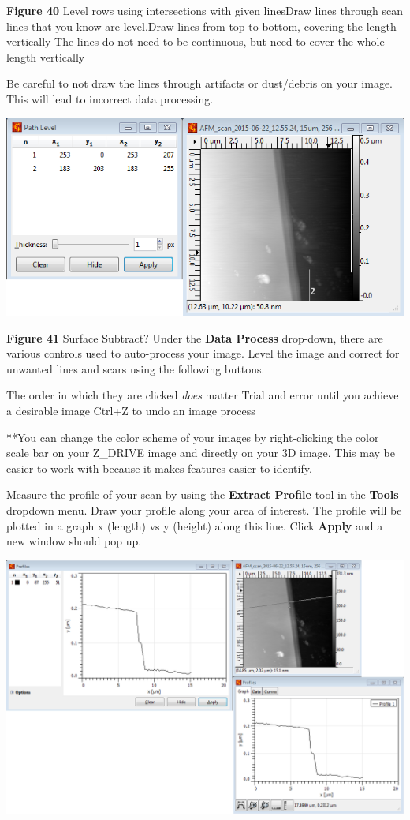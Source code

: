 \documentclass{../lab}
\begin{document}
\textbf{Figure 40}
 Level rows using intersections with given linesDraw lines through scan lines that you know are level.Draw lines from top to bottom, covering the length vertically
The lines do not need to be continuous, but need to cover the whole length vertically

Be careful to not draw the lines through artifacts or dust/debris on your image. This will lead to incorrect data processing.


\begin{center}
    \href{http://experimentationlab.berkeley.edu/sites/default/files/AFMImages/47.png}{\includegraphics[width=0.5\linewidth]{images/47.png}}
\end{center}


\textbf{Figure 41}
Surface Subtract?
Under the \textbf{Data Process} drop-down, there are various controls used to auto-process your image.  Level the image and correct for unwanted lines and scars using the following buttons.

The order in which they are clicked \emph{does} matter
Trial and error until you achieve a desirable image
Ctrl+Z to undo an image process


**You can change the color scheme of your images by right-clicking the color scale bar on your Z\_DRIVE image and directly on your 3D image.  This may be easier to work with because it makes features easier to identify.

Measure the profile of your scan by using the \textbf{Extract Profile }tool  in the \textbf{Tools} dropdown menu.
Draw your profile along your area of interest.  The profile will be plotted in a graph x (length) vs y (height) along this line. Click \textbf{Apply} and a new window should pop up.


\begin{center}
    \href{http://experimentationlab.berkeley.edu/sites/default/files/AFMImages/49.png}{\includegraphics[width=0.5\linewidth]{images/49.png}}
\end{center}
\end{document}
